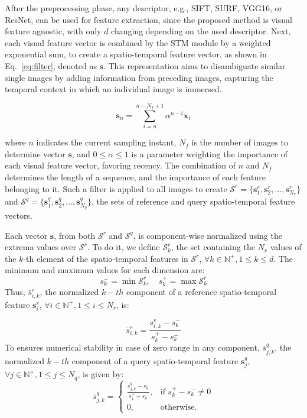 \documentclass[letterpaper, 10 pt, conference]{ieeeconf}  %
\begin{document}
After the preprocessing phase, any descriptor, e.g., SIFT, SURF, VGG16, or ResNet, can be used for feature extraction, since the proposed method is visual feature agnostic, with only $d$ changing depending on the used descriptor. Next, each visual feature vector is combined by the STM module by a weighted exponential sum, to create a spatio-temporal feature vector, as shown in Eq.~\eqref{eq:filter}, denoted as $\mathbf{s}$. This representation aims to disambiguate similar single images by adding information from preceding images, capturing the temporal context in which an individual image is immersed.


\begin{equation}\label{eq:filter}
    \mathbf{s}_n = \sum\limits_{i = n}^{n-N_{f}+1} \alpha^{n - i} \mathbf{x}_{i}
\end{equation}

\noindent 
where $n$ indicates the current sampling instant, $N_{f}$ is the number of images to determine vector $\mathbf{s}$, and  $0 \le \alpha \le 1$ is a parameter weighting the importance of each visual feature vector, favoring recency. The combination of $n$ and $N_{f}$ determines the length of a sequence, and the importance of each feature belonging to it. Such a filter is applied to all  images to create \( \mathcal{S}^r = \{ \mathbf{s}^r_1, \mathbf{s}^r_2, \dots, \mathbf{s}^r_{N_r} \}  \) and \( \mathcal{S}^q = \{ \mathbf{s}^q_1, \mathbf{s}^q_2, \dots, \mathbf{s}^q_{N_q} \} \), the sets of reference and query spatio-temporal feature vectors. 


Each vector $\mathbf{s}$, from both $\mathcal{S}^r$ and $\mathcal{S}^q$, is component-wise normalized using the extrema values over \( \mathcal{S}^r \). To do it, we define $\mathcal{S}^r_k$, the set containing the $N_r$ values of the $k$-th element of the spatio-temporal features in $\mathcal{S}^r$, $\forall k \in  \mathbb{N}^+, 1 \leq k \leq d$. The minimum and maximum values for each dimension are:
%
$$
s^-_{k} = \min \mathcal{S}^r_k, \quad
s^+_{k} = \max \mathcal{S}^r_k
$$
%
Thus, $\bar{s}^{r}_{i,k}$, the normalized $k-th$ component of a reference spatio-temporal feature $\mathbf{s}^r_i$, $\forall i \in  \mathbb{N}^+, 1 \leq i \leq N_r$, is:

%
\begin{equation}
\bar{s}^{r}_{i,k} = \frac{s^r_{i,k} - s^-_{k}}{s^+_{k} - s^-_{k}}
\end{equation}
To ensures numerical stability in case of zero range in any component, $\bar{s}^{q}_{j,k}$, the normalized $k-th$ component of a query spatio-temporal feature $\mathbf{s}^q_j$, $\forall j \in  \mathbb{N}^+, 1 \leq j \leq N_q$, is given by:
\begin{equation}
\bar{s}^{q}_{j,k} =
\begin{cases}
\displaystyle \frac{s^q_{j,k} - s^-_{k}}{s^+_{k} - s^-_{k}}, & \text{if } s^+_{k} - s^-_{k} \ne 0 \\
0, & \text{otherwise}.
\end{cases}
\end{equation}
\end{document}
